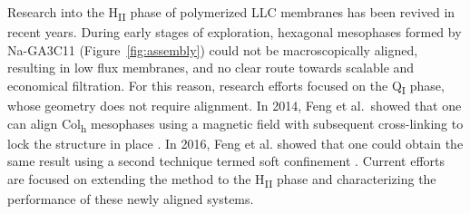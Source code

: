\documentclass[journal=jpcbfk,manusciprt=article]{achemso}
\begin{document}
  Research into the H\textsubscript{II} phase of polymerized LLC membranes has
  been revived in recent years. During early stages of exploration, hexagonal
  mesophases formed by Na-GA3C11 (Figure~\ref{fig:assembly}) could not be
  macroscopically aligned, resulting in low flux membranes, and no clear route
  towards scalable and economical filtration. For this reason, research efforts
  focused on the Q\textsubscript{I} phase, whose geometry does not require
  alignment. In 2014, Feng et al.~showed that one can align 
  Col\textsubscript{h} mesophases using a magnetic field with subsequent
  cross-linking to lock the structure in place \cite{feng_scalable_2014}. In
  2016, Feng et al. showed that one could obtain the same result using a second
  technique termed soft confinement \cite{feng_thin_2016}. Current efforts are
  focused on extending the method to the H\textsubscript{II} phase and 
  characterizing the performance of these newly aligned systems.


\end{document}
